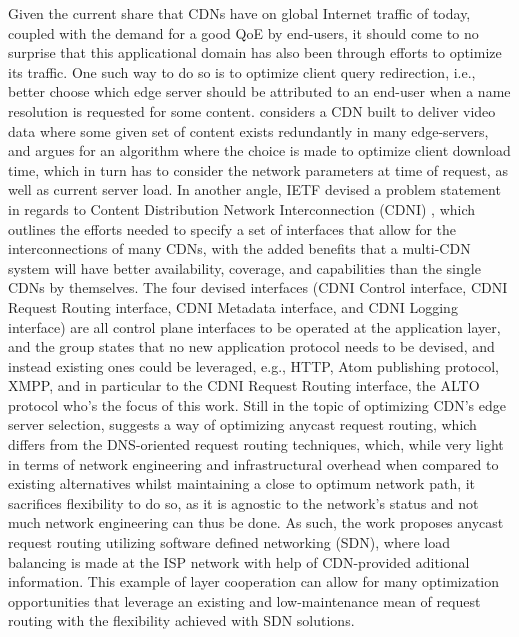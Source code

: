    Given the current share that CDNs have on global Internet traffic of today, coupled with the demand for a good QoE by end-users, it should come to no surprise that this applicational domain has also been through efforts to optimize its traffic.
    One such way to do so is to optimize client query redirection, i.e., better choose which edge server should be attributed to an end-user when a name resolution is requested for some content.
    \cite{gromov2014} considers a CDN built to deliver video data where some given set of content exists redundantly in many edge-servers, and argues for an algorithm where the choice is made to optimize client download time, which in turn has to consider the network parameters at time of request, as well as current server load.
    In another angle, IETF devised a problem statement in regards to Content Distribution Network Interconnection (CDNI) \cite{cdni-problem-statement}, which outlines the efforts needed to specify a set of interfaces that allow for the interconnections of many CDNs, with the added benefits that a multi-CDN system will have better availability, coverage, and capabilities than the single CDNs by themselves.
    The four devised interfaces (CDNI Control interface, CDNI Request Routing interface, CDNI Metadata interface, and CDNI Logging interface) are all control plane interfaces to be operated at the application layer, and the group states that no new application protocol needs to be devised, and instead existing ones could be leveraged, e.g., HTTP, Atom publishing protocol, XMPP, and in particular to the CDNI Request Routing interface, the ALTO protocol who's the focus of this work.
    Still in the topic of optimizing CDN's edge server selection, \cite{wichtlhuber2017} suggests a way of optimizing anycast request routing, which differs from the DNS-oriented request routing techniques, which, while very light in terms of network engineering and infrastructural overhead when compared to existing alternatives whilst maintaining a close to optimum network path, it sacrifices flexibility to do so, as it is agnostic to the network's status and not much network engineering can thus be done.
    As such, the work proposes anycast request routing utilizing software defined networking (SDN), where load balancing is made at the ISP network with help of CDN-provided aditional information.
    This example of layer cooperation can allow for many optimization opportunities that leverage an existing and low-maintenance mean of request routing with the flexibility achieved with SDN solutions.


